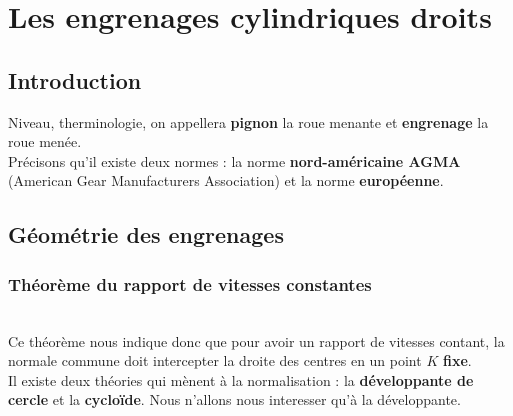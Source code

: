 \section{Les engrenages cylindriques droits}
\subsection{Introduction}
	Niveau, therminologie, on appellera \textbf{pignon} la roue menante et \textbf{engrenage} la roue menée. \\
	Précisons qu'il existe deux normes : la norme \textbf{nord-américaine AGMA} (American Gear Manufacturers Association) et la norme \textbf{européenne}. 
	
\subsection{Géométrie des engrenages}
\subsubsection{Théorème du rapport de vitesses constantes}
	\ \\
	Ce théorème nous indique donc que pour avoir un rapport de vitesses contant, la normale commune doit intercepter la droite des centres en un point $K$ \textbf{fixe}. \\
	Il existe deux théories qui mènent à la normalisation : la \textbf{développante de cercle} et la \textbf{cycloïde}. Nous n'allons nous interesser qu'à la développante.
	
\newpage	
	
